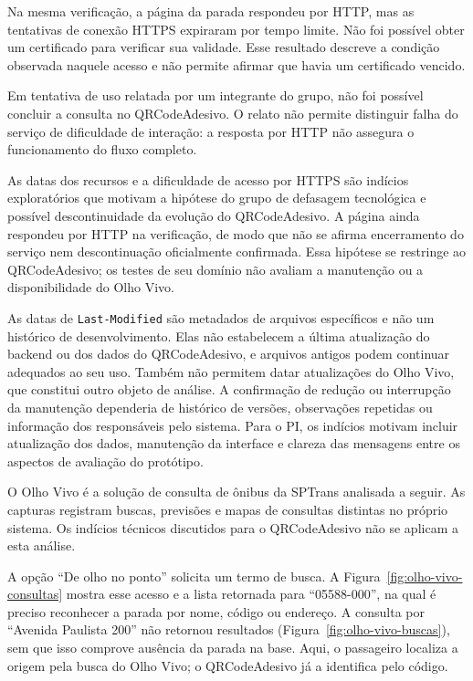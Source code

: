 \documentclass[12pt,oneside,a4paper,brazil,chapter=TITLE]{abntex2}
\begin{document}
Na mesma verificação, a página da parada respondeu por HTTP, mas as tentativas de conexão HTTPS expiraram por tempo limite. Não foi possível obter um certificado para verificar sua validade. Esse resultado descreve a condição observada naquele acesso e não permite afirmar que havia um certificado vencido.

Em tentativa de uso relatada por um integrante do grupo, não foi possível concluir a consulta no QRCodeAdesivo. O relato não permite distinguir falha do serviço de dificuldade de interação: a resposta por HTTP não assegura o funcionamento do fluxo completo.

As datas dos recursos e a dificuldade de acesso por HTTPS são indícios exploratórios que motivam a hipótese do grupo de defasagem tecnológica e possível descontinuidade da evolução do QRCodeAdesivo. A página ainda respondeu por HTTP na verificação, de modo que não se afirma encerramento do serviço nem descontinuação oficialmente confirmada. Essa hipótese se restringe ao QRCodeAdesivo; os testes de seu domínio não avaliam a manutenção ou a disponibilidade do Olho Vivo.

As datas de \texttt{Last-Modified} são metadados de arquivos específicos e não um histórico de desenvolvimento. Elas não estabelecem a última atualização do backend ou dos dados do QRCodeAdesivo, e arquivos antigos podem continuar adequados ao seu uso. Também não permitem datar atualizações do Olho Vivo, que constitui outro objeto de análise. A confirmação de redução ou interrupção da manutenção dependeria de histórico de versões, observações repetidas ou informação dos responsáveis pelo sistema. Para o PI, os indícios motivam incluir atualização dos dados, manutenção da interface e clareza das mensagens entre os aspectos de avaliação do protótipo.


\clearpage
\label{sec:analise-olhovivo}
O Olho Vivo é a solução de consulta de ônibus da SPTrans analisada a seguir. As capturas registram buscas, previsões e mapas de consultas distintas no próprio sistema. Os indícios técnicos discutidos para o QRCodeAdesivo não se aplicam a esta análise.

A opção ``De olho no ponto'' solicita um termo de busca. A Figura~\ref{fig:olho-vivo-consultas} mostra esse acesso e a lista retornada para ``05588-000'', na qual é preciso reconhecer a parada por nome, código ou endereço. A consulta por ``Avenida Paulista 200'' não retornou resultados (Figura~\ref{fig:olho-vivo-buscas}), sem que isso comprove ausência da parada na base. Aqui, o passageiro localiza a origem pela busca do Olho Vivo; o QRCodeAdesivo já a identifica pelo código.
\end{document}
